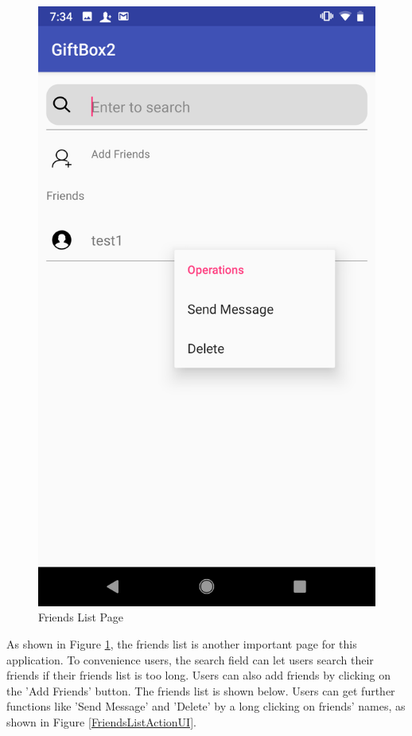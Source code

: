 \begin{figure}[H]
\begin{minipage}[t]{0.27\textwidth}
\includegraphics[width=.95\textwidth]{section03/assets/FriendsListAction.png}
\subcaption{\label{FriendsListActionUI}}
\end{minipage}%
\caption[Short Caption 2]{\label{WholeFriendsListUI}Friends List Page}
\end{figure}

\par As shown in Figure \ref{WholeFriendsListUI}, the friends list is another important page for this application. To convenience users, the search field can let users search their friends if their friends list is too long. Users can also add friends by clicking on the 'Add Friends' button. The friends list is shown below. Users can get further functions like 'Send Message' and 'Delete' by a long clicking on friends' names, as shown in Figure \ref{FriendsListActionUI}. 

